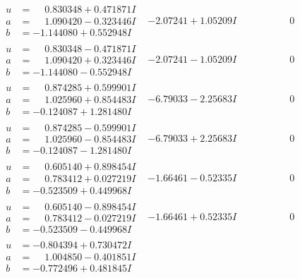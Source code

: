 \documentclass[1p]{elsarticle_modified}
\theoremstyle{definition}
\begin{document}
$$\begin{array}{c|c|c}
\begin{aligned}
u &= \phantom{-}0.830348 + 0.471871 I \\
a &= \phantom{-}1.090420 - 0.323446 I \\
b &= -1.144080 + 0.552948 I\end{aligned}
 & -2.07241 + 1.05209 I & \phantom{-0.000000 } 0 \\ \hline\begin{aligned}
u &= \phantom{-}0.830348 - 0.471871 I \\
a &= \phantom{-}1.090420 + 0.323446 I \\
b &= -1.144080 - 0.552948 I\end{aligned}
 & -2.07241 - 1.05209 I & \phantom{-0.000000 } 0 \\ \hline\begin{aligned}
u &= \phantom{-}0.874285 + 0.599901 I \\
a &= \phantom{-}1.025960 + 0.854483 I \\
b &= -0.124087 + 1.281480 I\end{aligned}
 & -6.79033 - 2.25683 I & \phantom{-0.000000 } 0 \\ \hline\begin{aligned}
u &= \phantom{-}0.874285 - 0.599901 I \\
a &= \phantom{-}1.025960 - 0.854483 I \\
b &= -0.124087 - 1.281480 I\end{aligned}
 & -6.79033 + 2.25683 I & \phantom{-0.000000 } 0 \\ \hline\begin{aligned}
u &= \phantom{-}0.605140 + 0.898454 I \\
a &= \phantom{-}0.783412 + 0.027219 I \\
b &= -0.523509 + 0.449968 I\end{aligned}
 & -1.66461 - 0.52335 I & \phantom{-0.000000 } 0 \\ \hline\begin{aligned}
u &= \phantom{-}0.605140 - 0.898454 I \\
a &= \phantom{-}0.783412 - 0.027219 I \\
b &= -0.523509 - 0.449968 I\end{aligned}
 & -1.66461 + 0.52335 I & \phantom{-0.000000 } 0 \\ \hline\begin{aligned}
u &= -0.804394 + 0.730472 I \\
a &= \phantom{-}1.004850 - 0.401851 I \\
b &= -0.772496 + 0.481845 I\end{aligned}

\end{array}$$
\end{document}
